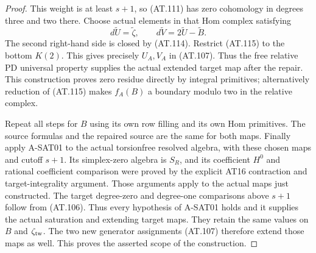 \begin{proof}
This weight is at least $s+1$, so (AT.111) has zero
cohomology in degrees three and two there.
Choose actual elements in that Hom complex satisfying
\[
 d\widetilde U=\widetilde\zeta,\qquad
 d\widetilde V=2\widetilde U-\widetilde B.
 \tag{AT.115}
\]
The second right-hand side is closed by (AT.114).
Restrict (AT.115) to the bottom $K(2)$.
This gives precisely $U_A,V_A$ in (AT.107).
Thus the free relative PD universal property supplies
the actual extended target map after the repair.
This construction proves zero residue directly by
integral primitives; alternatively reduction of
(AT.115) makes $f_A(B)$ a boundary modulo two in
the relative complex.

Repeat all steps for $B$ using its own row filling
and its own Hom primitives. The source formulas and
the repaired source are the same for both maps.
Finally apply A-SAT01 to the actual torsionfree resolved
algebra, with these chosen maps and cutoff $s+1$.
Its simplex-zero algebra is $S_R$, and its coefficient
$H^0$ and rational coefficient comparison were proved
by the explicit AT16 contraction and target-integrality
argument. Those arguments apply to the actual maps
just constructed. The target degree-zero and degree-one
comparisons above $s+1$ follow from (AT.106).
Thus every hypothesis of A-SAT01 holds and it supplies
the actual saturation and extending target maps.
They retain the same values on $B$ and $\zeta_{\rm tw}$.
The two new generator assignments (AT.107) therefore
extend those maps as well. This proves the asserted
scope of the construction.
\end{proof}
